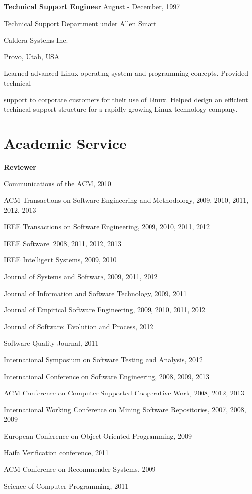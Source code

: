 \documentclass[margin,line,article,letterpaper]{res}
\newenvironment{list1}{
  \begin{list}{}{%
      \setlength{\itemsep}{0in}
      \setlength{\parsep}{0in} \setlength{\parskip}{0in}
      \setlength{\topsep}{0in} \setlength{\partopsep}{0in} 
      \setlength{\leftmargin}{0.17in}}}{\end{list}}
\newcommand{\timespan}[1]{#1}
\begin{document}
\begin{resume}
\textbf{Technical Support Engineer} \hfill \timespan{August - December, 1997}\\
\vspace{-10pt}
\begin{list1}
\item Technical Support Department under Allen Smart
\item Caldera Systems Inc.
\item Provo, Utah, USA
\vspace{6pt}
\item Learned advanced Linux operating system and programming concepts. Provided technical

support to corporate customers for their use of Linux. Helped design an efficient 
techincal support structure for a rapidly growing Linux technology company.
\end{list1}


\section{Academic \hspace{.2in} Service}
\textbf{Reviewer}
\begin{list1}
\item Communications of the ACM, 2010
\item ACM Transactions on Software Engineering and Methodology, 2009, 2010, 2011, 2012, 2013
\item IEEE Transactions on Software Engineering, 2009, 2010, 2011, 2012
\item IEEE Software, 2008, 2011, 2012, 2013
\item IEEE Intelligent Systems, 2009, 2010
\item Journal of Systems and Software, 2009, 2011, 2012
\item Journal of Information and Software Technology, 2009, 2011
\item Journal of Empirical Software Engineering, 2009, 2010, 2011, 2012
\item Journal of Software: Evolution and Process, 2012
\item Software Quality Journal, 2011
\item International Symposium on Software Testing and Analysis, 2012
\item International Conference on Software Engineering, 2008, 2009, 2013
\item ACM Conference on Computer Supported Cooperative Work, 2008, 2012, 2013
\item International Working Conference on Mining Software Repositories, 2007, 2008, 2009
\item European Conference on Object Oriented Programming, 2009
\item Haifa Verification conference, 2011
\item ACM Conference on Recommender Systems, 2009
\item Science of Computer Programming, 2011
\end{list1}


\end{resume}
\end{document}
